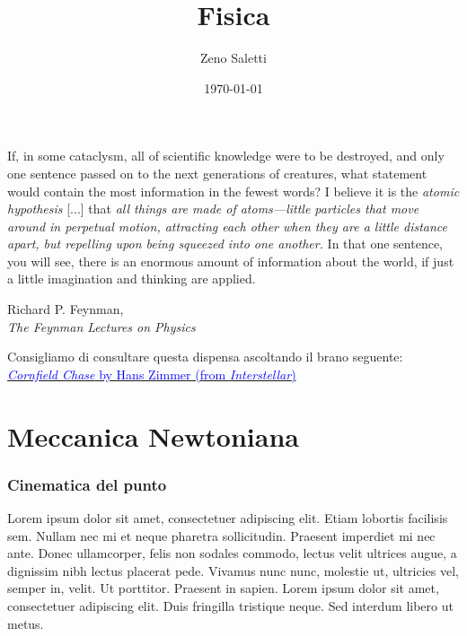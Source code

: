 \documentclass{book}
\title{Fisica}
\author{Zeno Saletti}
\date{\today}
\begin{document}
\begin{titlepage}

\maketitle

\epigraph{If, in some cataclysm, all of scientific knowledge were
to be destroyed, and only one sentence passed on to the next generations
of creatures, what statement would contain the most information in the
fewest words? I believe it is the \textit{atomic hypothesis} [...]
that \textit{all things are made of atoms—little particles that move
around in perpetual motion, attracting each other when they are a little
distance apart, but repelling upon being squeezed into one another.}
In that one sentence, you will see, there is an enormous amount of
information about the world, if just a little imagination and
thinking are applied.}{Richard P. Feynman,\\\textit{The Feynman Lectures on Physics}}

\vspace*{9cm}
\begin{center}
Consigliamo di consultare questa dispensa ascoltando il brano seguente:\\
\href{https://www.youtube.com/watch?v=JuSsvM8B4Jc}{\textcolor{blue}{\textit{Cornfield Chase} by Hans Zimmer (from \textit{Interstellar})}}
\end{center}

\end{titlepage}


\tableofcontents


\part{Meccanica Newtoniana}



\section{Cinematica del punto}\marginpar{\minitoc}
Lorem ipsum dolor sit amet, consectetuer adipiscing elit. Etiam lobortis facilisis
sem. Nullam nec mi et neque pharetra sollicitudin. Praesent imperdiet mi nec
ante. Donec ullamcorper, felis non sodales commodo, lectus velit ultrices augue,
a dignissim nibh lectus placerat pede. Vivamus nunc nunc, molestie ut, ultricies
vel, semper in, velit. Ut porttitor. Praesent in sapien. Lorem ipsum dolor sit
amet, consectetuer adipiscing elit. Duis fringilla tristique neque. Sed interdum
libero ut metus.
\end{document}
